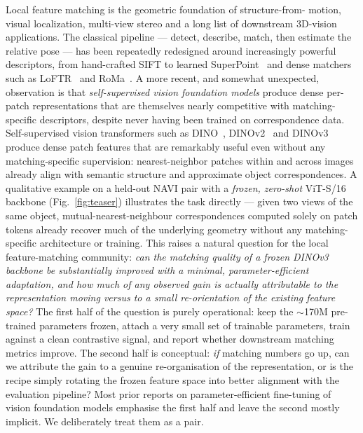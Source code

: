 \documentclass[10pt,twocolumn,letterpaper]{article}
\begin{document}
Local feature matching is the geometric foundation of structure-from-
motion, visual localization, multi-view stereo and a long list of
downstream 3D-vision applications. The classical pipeline
--- detect, describe, match, then estimate the relative pose --- has been
repeatedly redesigned around increasingly powerful descriptors, from
hand-crafted SIFT to learned SuperPoint~\cite{superpoint} and
dense matchers such as LoFTR~\cite{loftr} and RoMa~\cite{roma}.
A more recent, and somewhat unexpected, observation is that
\emph{self-supervised vision foundation models} produce dense per-patch
representations that are themselves nearly competitive with
matching-specific descriptors, despite never having been trained on
correspondence data. Self-supervised vision transformers such as
DINO~\cite{dino}, DINOv2~\cite{dinov2} and
DINOv3~\cite{darcet2023registers} produce dense
patch features that are remarkably useful even without any
matching-specific supervision: nearest-neighbor patches within and
across images already align with semantic structure and approximate
object correspondences. A qualitative example on a held-out NAVI pair
with a \emph{frozen, zero-shot} ViT-S/16 backbone
(Fig.~\ref{fig:teaser}) illustrates the task directly --- given two
views of the same object, mutual-nearest-neighbour correspondences
computed solely on patch tokens already recover much of the underlying
geometry without any matching-specific architecture or training.
This raises a natural question for the local feature-matching
community: \emph{can the matching quality of a frozen DINOv3 backbone
be substantially improved with a minimal, parameter-efficient
adaptation, and how much of any observed gain is actually attributable
to the representation moving versus to a small re-orientation of the
existing feature space?} The first half of the question is purely
operational: keep the $\sim$170M pre-trained parameters frozen, attach
a very small set of trainable parameters, train against a clean
contrastive signal, and report whether downstream matching metrics
improve. The second half is conceptual: \emph{if} matching numbers go
up, can we attribute the gain to a genuine re-organisation of the
representation, or is the recipe simply rotating the frozen feature
space into better alignment with the evaluation pipeline? Most
prior reports on parameter-efficient fine-tuning of vision foundation
models emphasise the first half and leave the second mostly
implicit. We deliberately treat them as a pair.
\end{document}
